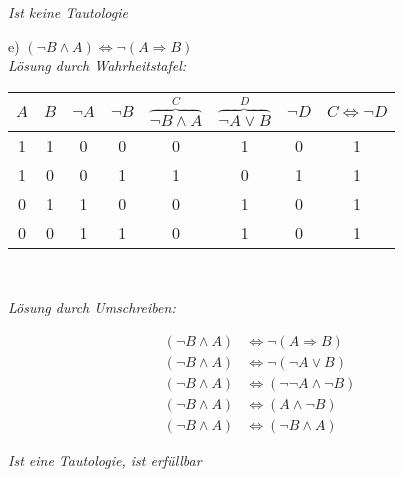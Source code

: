 \textit{Ist keine Tautologie}\\

\newpage

e) $(\lnot B \land A) \Leftrightarrow \lnot (A \Rightarrow B)$\\

\textit{Lösung durch Wahrheitstafel:}

\begin{table}[h]
\centering
\begin{tabular}{c|c|c|c|c|c|c|c}
$A$ & $B$ & $\lnot A$ & $\lnot B$ & $\overbrace{\lnot B \land A}^{C}$ & $\overbrace{\lnot A \lor B}^{D}$ & $\lnot D$ & $C \Leftrightarrow \lnot D$\\
\hline
1 & 1 & 0 & 0 & 0 & 1 & 0 & 1\\
1 & 0 & 0 & 1 & 1 & 0 & 1 & 1\\
0 & 1 & 1 & 0 & 0 & 1 & 0 & 1\\
0 & 0 & 1 & 1 & 0 & 1 & 0 & 1\\
\end{tabular}
\end{table}\

\textit{Lösung durch Umschreiben:}

\begin{align*}
(\lnot B \land A) &\Leftrightarrow \lnot (A \Rightarrow B)\\
(\lnot B \land A) &\Leftrightarrow \lnot (\lnot A \lor B)\\
(\lnot B \land A) &\Leftrightarrow (\lnot \lnot A \land \lnot B)\\
(\lnot B \land A) &\Leftrightarrow (A \land \lnot B)\\
(\lnot B \land A) &\Leftrightarrow (\lnot B \land A) 
\end{align*}


\textit{Ist eine Tautologie, ist erfüllbar}